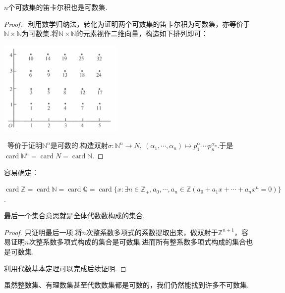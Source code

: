 \documentclass[lang=cn, zihao=5]{elegantbook}
\newcommand{\Z}{\mathbb{Z}}
\DeclareMathOperator{\card}{card}
\begin{document}
\begin{proposition}
	$n$个可数集的笛卡尔积也是可数集.
\end{proposition}
\begin{proof}
	~利用数学归纳法，转化为证明两个可数集的笛卡尔积为可数集，亦等价于$\mathbb{N} \times \mathbb{N}$为可数集.将$\mathbb{N} \times \mathbb{N}$的元素视作二维向量，构造如下排列即可：
	\begin{center}
		\includegraphics[width=6cm]{attachment/iShot_2023-08-04_15.19.06.png}
	\end{center}
	
	~等价于证明$\mathbb{N}^n$是可数的.构造双射$\sigma :\mathbb{N}^n \to N,~(\alpha _1, \cdots ,\alpha _n) \mapsto p_1^{\alpha _1} \cdots p_n^{\alpha _n}$.于是$\card \mathbb{N}^n = \card N = \card \mathbb{N}$.
\end{proof}

容易确定：

\begin{proposition}
	$\card \mathbb{Z} = \card \mathbb{N} = \card \mathbb{Q} = \card \{ x:\exists n \in \mathbb{Z}_+,a_0, \cdots ,a_n \in \mathbb{Z}(a_0+a_1x+\cdots +a_nx^n=0) \}$.
\end{proposition}
\begin{remark}
	最后一个集合意思就是全体代数数构成的集合.
\end{remark}
\begin{proof}
	只证明最后一项.将$n$次整系数多项式的系数提取出来，做双射于$\Z ^{n+1}$，容易证明$n$次整系数多项式构成的集合是可数集.进而所有整系数多项式构成的集合也是可数集.
	
	利用代数基本定理可以完成后续证明.
\end{proof}

虽然整数集、有理数集甚至代数数集都是可数的，我们仍然能找到许多不可数集.
\end{document}
